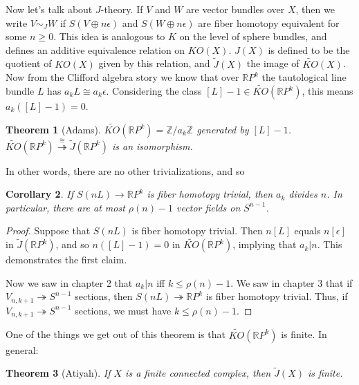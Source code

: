 \documentclass{article}
\newcommand{\Z}{\mathbb{Z}}
\newcommand{\R}{\mathbb{R}}
\newcommand{\RP}{\R P}
\newcommand{\onto}{\twoheadrightarrow}
\newtheorem{thm}{Theorem}[section]
\newtheorem{cor}[thm]{Corollary}
\begin{document}
Now let's talk about $J$-theory.  If $V$ and $W$ are vector bundles over $X$, then we write $V \sim_J W$ if $S(V \oplus n \epsilon)$ and $S(W \oplus n \epsilon)$ are fiber homotopy equivalent for some $n\geq0$. This idea is analogous to $K$ on the level of sphere bundles, and defines an additive equivalence relation on $KO(X)$. $J(X)$ is defined to be the quotient of $KO(X)$ given by this relation, and $\widetilde J(X)$ the image of $\widetilde{KO}(X)$. %
Now from the Clifford algebra story we know that over $\RP^k$ the tautological line bundle $L$ has $a_k L \cong a_k \epsilon$. %
Considering the class $[L] - 1 \in \widetilde{KO}(\RP^k)$, this means $a_k([L] - 1) = 0$. %
\begin{thm}[Adams]
$\widetilde{KO}(\RP^k)=\Z/a_k\Z$ generated by $[L]-1$.
$\widetilde{KO}(\RP^k) \stackrel{\cong}{\onto} \widetilde J(\RP^k)$ is an isomorphism.
\end{thm}
In other words, there are no other trivializations, and so %
\begin{cor}
If $S(nL) \to \RP^k$ is fiber homotopy trivial, then $a_k$ divides $n$. In particular, there are at most $\rho(n) - 1$ vector fields on $S^{n-1}$. %
\end{cor}
\begin{proof}
Suppose that $S(nL)$ is fiber homotopy trivial. Then $n[L]$ equals $n[\epsilon]$ in $\widetilde J(\R P^k)$, and so $n([L]-1)=0$ in $\widetilde{KO}(\RP^k)$, implying that $a_k|n$. This demonstrates the first claim.

Now we saw in chapter 2 that $a_k|n$ iff $k\leq \rho(n)-1$. We saw in chapter 3 that if $V_{n, k+1} \onto S^{n-1}$ sections, then $S(nL)\onto \R P^{k}$ is fiber homotopy trivial. Thus, if $V_{n, k+1} \onto S^{n-1}$ sections, we must have $k\leq\rho(n)-1$.
\end{proof}
One of the things we get out of this theorem is that $\widetilde{KO}(\RP^k)$ is finite. In general: %
\begin{thm}[Atiyah]
If $X$ is a finite connected complex, then $\widetilde J(X)$ is finite.
\end{thm}
\end{document}
